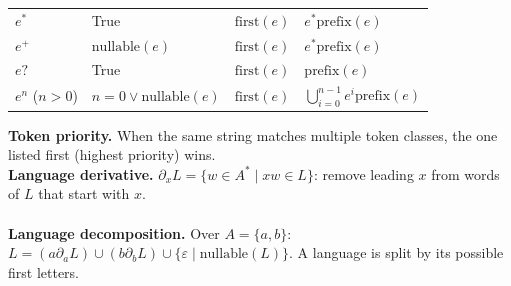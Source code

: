 \documentclass[9pt, a4paper]{extarticle}
\begin{document}
\begin{minipage}[t]{0.495\textwidth}
{\begin{tabular}{@{}llll@{}}
$e^*$ & True & $\text{first}(e)$ & $e^* \text{prefix}(e)$ \\
$e^+$ & $\text{nullable}(e)$ & $\text{first}(e)$ & $e^* \text{prefix}(e)$ \\
$e?$ & True & $\text{first}(e)$ & $\text{prefix}(e)$ \\
$e^n$ ($n>0$) & $n=0 \lor \text{nullable}(e)$ & $\text{first}(e)$ & $\bigcup_{i=0}^{n-1} e^i \text{prefix}(e)$ \\
\bottomrule
\end{tabular}%
}
\textbf{Token priority.} When the same string matches multiple token classes, the one listed first (highest priority) wins. \\
\textbf{Language derivative.} $\partial_x L = \{w \in A^* \mid xw \in L\}$: remove leading $x$ from words of $L$ that start with $x$.\\
\\
\textbf{Language decomposition.} Over $A=\{a,b\}$: $L = (a\partial_a L) \cup (b\partial_b L) \cup \{\varepsilon \mid \text{nullable}(L)\}$. A language is split by its possible first letters.\\

\end{minipage}
\end{document}
